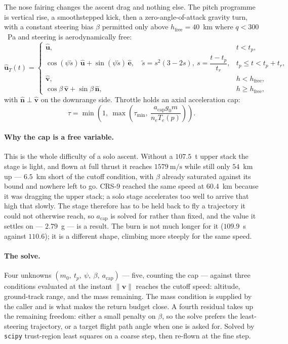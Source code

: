 \documentclass[11pt,a4paper]{article}
\newcommand{\vect}[1]{\mathbf{#1}}
\newcommand{\code}[1]{\texttt{#1}}
\begin{document}
The nose fairing changes the ascent drag and nothing else. The pitch programme is
vertical rise, a smoothstepped kick, then a zero-angle-of-attack gravity turn,
with a constant steering bias $\beta$ permitted only above $h_{\mathrm{free}}=40$~km
where $q<300$~Pa and steering is aerodynamically free:
\begin{equation}
\hat{\vect{u}}_T(t) =
\begin{cases}
\hat{\vect{u}}, & t<t_p,\\[1ex]
\cos(\psi\tilde s)\,\hat{\vect{u}} + \sin(\psi\tilde s)\,\hat{\vect{e}},
  \quad \tilde s = s^2(3-2s),\ s=\dfrac{t-t_p}{t_r}, & t_p \le t < t_p+t_r,\\[2ex]
\hat{\vect{v}}, & h<h_{\mathrm{free}},\\[1ex]
\cos\beta\,\hat{\vect{v}} + \sin\beta\,\hat{\vect{n}}, & h\ge h_{\mathrm{free}},
\end{cases}
\end{equation}
with $\hat{\vect{n}}\perp\hat{\vect{v}}$ on the downrange side. Throttle holds an
axial acceleration cap:
\begin{equation}
\tau = \min\!\left(1,\ \max\!\left(\tau_{\min},\ \frac{a_{\mathrm{cap}} g_0 m}{n_e T_e(p)}\right)\right).
\end{equation}

\paragraph{Why the cap is a free variable.} This is the whole difficulty of a
solo ascent. Without a $107.5$~t upper stack the stage is light, and flown at
full thrust it reaches $1579\ \mathrm{m/s}$ while still only $54$~km up ---
$6.5$~km short of the cutoff condition, with $\beta$ already saturated against
its bound and nowhere left to go. CRS-9 reached the same speed at $60.4$~km
because it was dragging the upper stack; a solo stage accelerates too well to
arrive that high that slowly. The stage therefore has to be held back to fly a
trajectory it could not otherwise reach, so $a_{\mathrm{cap}}$ is solved for
rather than fixed, and the value it settles on --- $2.79$~g --- is a result. The
burn is not much longer for it ($109.9$~s against $110.6$); it is a different
shape, climbing more steeply for the same speed.

\paragraph{The solve.} Four unknowns
$(m_0,\ t_p,\ \psi,\ \beta,\ a_{\mathrm{cap}})$ --- five, counting the cap ---
against three conditions evaluated at the instant $\lVert\vect{v}\rVert$ reaches
the cutoff speed: altitude, ground-track range, and the mass remaining. The mass
condition is supplied by the caller and is what makes the return budget close.
A fourth residual takes up the remaining freedom: either a small penalty on
$\beta$, so the solve prefers the least-steering trajectory, or a target flight
path angle when one is asked for. Solved by \code{scipy} trust-region least
squares on a coarse step, then re-flown at the fine step.
\end{document}
